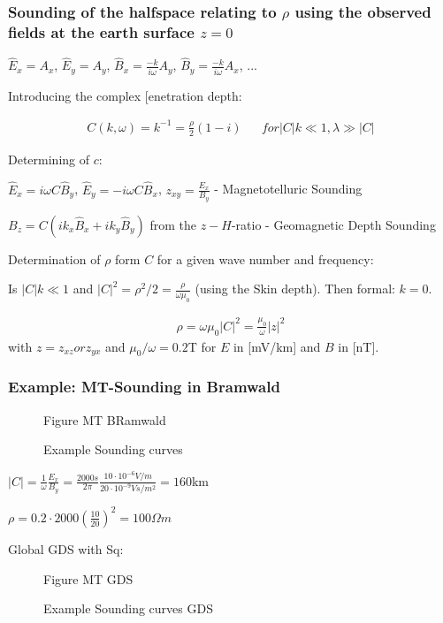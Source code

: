 \subsubsection*{Sounding of the halfspace relating to $\rho$ using the observed fields at the earth surface $z=0$}

$\hat{E}_x=A_x$, $\hat{E}_y=A_y$, $\hat{B}_x=\frac{-k}{i\omega}A_y$, $\hat{B}_y=\frac{-k}{i\omega}A_x$, ...

Introducing the complex [enetration depth:

\begin{align}
C(k,\omega)=k^{-1}=\frac{\rho}{2}(1-i) && for |C|k\ll 1, \lambda \gg |C|
\end{align}

Determining of $c$: 

$\hat{E}_x=i\omega C \hat{B}_y$, $\hat{E}_y=-i\omega C \hat{B}_x$, $z_{xy}=\frac{E_x}{B_y}$ - Magnetotelluric Sounding

$B_z=C (i k_x\hat{B}_x+i k_y\hat{B}_y)$ from the $z-H$-ratio - Geomagnetic Depth Sounding


Determination of $\rho$ form $C$ for a given wave number and frequency:

Is $|C|k\ll 1$ and $|C|^2=\rho^2/2=\frac{\rho}{\omega\mu_0}$ (using the Skin depth). Then formal: $k=0$.

\begin{align*}
\rho=\omega\mu_0|C|^2=\frac{\mu_0}{\omega}|z|^2
\end{align*}
with $z=z_{xz} or z_{yx}$ and $\mu_0/\omega=0.2$T for $E$ in [mV/km] and $B$ in [nT].

\subsubsection*{Example: MT-Sounding in Bramwald}

\begin{figure}[H]
\begin{center}
Figure MT BRamwald 
\caption{Example Sounding curves}
\label{fig:emexample01}
\end{center}
\end{figure}


$|C|=\frac{1}{\omega}\frac{E_x}{B_y}=\frac{2000s}{2\pi}\frac{10\cdot 10^{-6}V/m}{20\cdot 10^{-9}Vs/m^2}=160$km

$\rho=0.2\cdot 2000 \left(\frac{10}{20}\right)^2=100 \Omega m$


Global GDS with Sq:

\begin{figure}[H]
\begin{center}
Figure MT GDS
\caption{Example Sounding curves GDS}
\label{fig:emexample2}
\end{center}
\end{figure}

